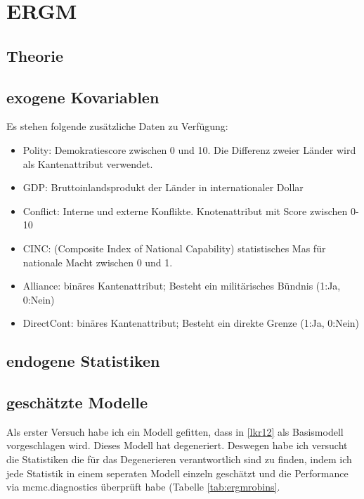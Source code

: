 \documentclass[a4paper,ngerman,oneside,titlepage,bibliography=totoc,11pt]{scrreprt}
\begin{document}
\chapter{ERGM}
\section{Theorie}
\section{exogene Kovariablen}
Es stehen folgende zusätzliche Daten zu Verfügung:
\begin{itemize}
  \item Polity: Demokratiescore zwischen 0 und 10. Die Differenz zweier Länder wird als Kantenattribut verwendet.
  \item GDP: Bruttoinlandsprodukt der Länder in internationaler Dollar
  \item Conflict: Interne und externe Konflikte. Knotenattribut mit Score zwischen 0-10
  \item CINC: (Composite Index of National Capability) statistisches Mas für nationale Macht zwischen 0 und 1.
  \item Alliance: binäres Kantenattribut; Besteht ein militärisches Bündnis (1:Ja, 0:Nein)
  \item DirectCont: binäres Kantenattribut; Besteht ein direkte Grenze (1:Ja, 0:Nein)
\end{itemize}
\section{endogene Statistiken}
\section{geschätzte Modelle}
Als erster Versuch habe ich ein Modell gefitten, dass in \ref{lkr12} als Basismodell vorgeschlagen wird. Dieses Modell hat degeneriert. Deswegen habe ich versucht die Statistiken die für das Degenerieren verantwortlich sind zu finden, indem ich jede Statistik in einem seperaten Modell einzeln geschätzt und die Performance via mcmc.diagnostics überprüft habe (Tabelle \ref{tab:ergmrobins}.
\end{document}
